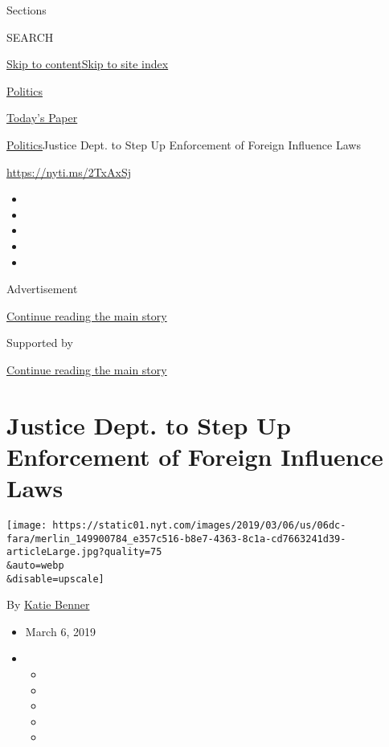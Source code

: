Sections

SEARCH

\protect\hyperlink{site-content}{Skip to
content}\protect\hyperlink{site-index}{Skip to site index}

\href{https://www.nytimes.com/section/politics}{Politics}

\href{https://myaccount.nytimes.com/auth/login?response_type=cookie\&client_id=vi}{}

\href{https://www.nytimes.com/section/todayspaper}{Today's Paper}

\href{/section/politics}{Politics}\textbar{}Justice Dept. to Step Up
Enforcement of Foreign Influence Laws

\url{https://nyti.ms/2TxAxSj}

\begin{itemize}
\item
\item
\item
\item
\item
\end{itemize}

Advertisement

\protect\hyperlink{after-top}{Continue reading the main story}

Supported by

\protect\hyperlink{after-sponsor}{Continue reading the main story}

\hypertarget{justice-dept-to-step-up-enforcement-of-foreign-influence-laws}{%
\section{Justice Dept. to Step Up Enforcement of Foreign Influence
Laws}\label{justice-dept-to-step-up-enforcement-of-foreign-influence-laws}}

\texttt{[image: https://static01.nyt.com/images/2019/03/06/us/06dc-fara/merlin\_149900784\_e357c516-b8e7-4363-8c1a-cd7663241d39-articleLarge.jpg?quality=75\\\&auto=webp\\\&disable=upscale]}

By \href{https://www.nytimes.com/by/katie-benner}{Katie Benner}

\begin{itemize}
\item
  March 6, 2019
\item
  \begin{itemize}
  \item
  \item
  \item
  \item
  \item
  \end{itemize}
\end{itemize}

